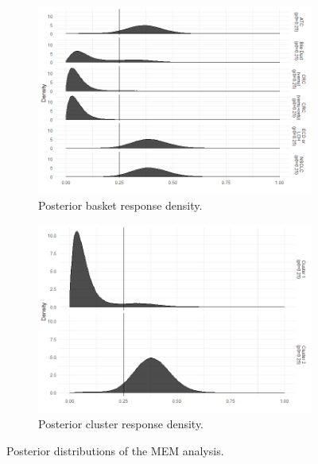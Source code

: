 \begin{figure}[htbp!]
    \centering
	\begin{subfigure}[b]{0.45\textwidth}
		\centering
		\includegraphics[width=\textwidth]{density_plot2.png}
		\caption{Posterior basket response density.}
		\label{cluster_post_density}
	\end{subfigure}
	\begin{subfigure}[b]{0.45\textwidth}
		\centering
		\includegraphics[width=\textwidth]{cluster_density_plot2.png}
		\caption{Posterior cluster response density.}
		\label{post_density}
	\end{subfigure}
	\caption{Posterior distributions of the MEM analysis.}
\end{figure}

